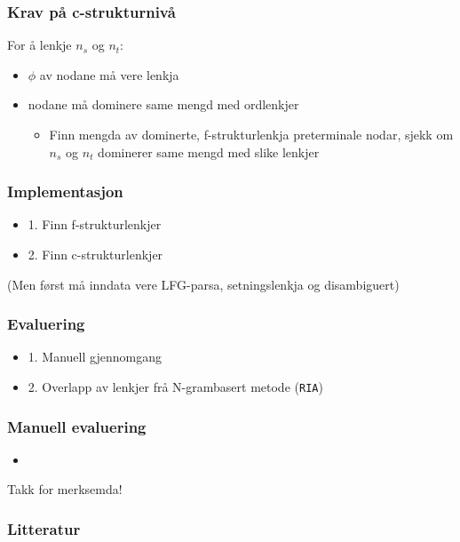 \documentclass[bigger]{beamer}
\begin{document}
\begin{frame}\frametitle{Krav på c-strukturnivå}
  For å lenkje $n_s$ og $n_t$:
  \begin{itemize}
  \item $\phi$ av nodane må vere lenkja
  \item nodane må dominere same mengd med ordlenkjer
    \begin{itemize}
    \item Finn mengda av dominerte, f-strukturlenkja preterminale
      nodar, sjekk om $n_s$ og $n_t$ dominerer same mengd med slike
      lenkjer
    \end{itemize}
  \end{itemize}
\end{frame}


\begin{frame}\frametitle{Implementasjon}
  \begin{itemize}
  \item 1. Finn f-strukturlenkjer
  \item 2. Finn c-strukturlenkjer
  \end{itemize}
  (Men først må inndata vere LFG-parsa, setningslenkja og disambiguert)
\end{frame}

\begin{frame}\frametitle{Evaluering}
  \begin{itemize}
  \item 1. Manuell gjennomgang
  \item 2. Overlapp av lenkjer frå N-grambasert metode (\texttt{RIA})
  \end{itemize}
\end{frame}

\begin{frame}\frametitle{Manuell evaluering}
  \begin{itemize}
  \item 
  \end{itemize}
\end{frame}



\begin{frame}
  \begin{center}
    {\huge Takk for merksemda!}
  \end{center}
\end{frame}

\begin{frame}\frametitle{Litteratur}
  \nocite{dyvik2009lmp}
  
  
\end{frame}
\end{document}
